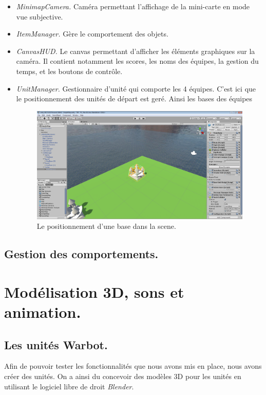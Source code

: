 \documentclass{report}
\begin{document}
\begin{itemize}
\item \textit{MinimapCamera.} Caméra permettant l'affichage de la mini-carte en mode vue subjective.
\item \textit{ItemManager.} Gère le comportement des objets.
\item \textit{CanvasHUD.} Le canvas permettant d'afficher les éléments graphiques sur la caméra. Il contient notamment les scores, les noms des équipes, la gestion du temps, et les boutons de contrôle.
\item \textit{UnitManager.} Gestionnaire d'unité qui comporte les 4 équipes. C'est ici que le positionnement des unités de départ est geré. Ainsi les bases des équipes 

\begin{figure}[!h]
\centering
\includegraphics[scale=0.35]{UnitManagerImage}
\caption{Le positionnement d'une base dans la scene.}
\end{figure}

\end{itemize}

\subsection{Gestion des comportements.}

\section{Modélisation 3D, sons et animation.}

\subsection{Les unités Warbot.}
Afin de pouvoir tester les fonctionnalités que nous avons mis en place, nous avons créer des unités. On a ainsi du concevoir des modèles 3D pour les unités en utilisant le logiciel libre de droit \textit{Blender}.
\end{document}
